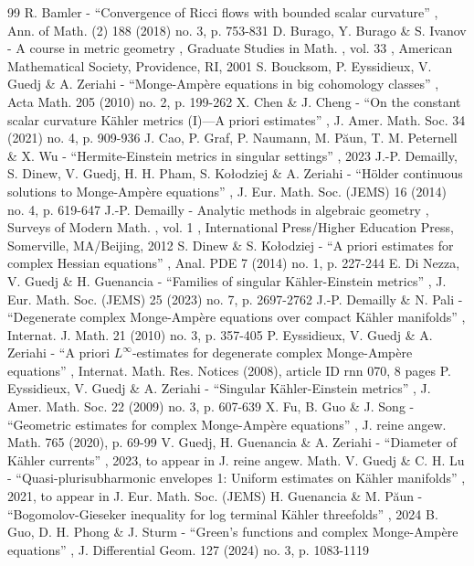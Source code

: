 \documentclass[10pt]{amsart}
\theoremstyle{definition}
\begin{document}
\begin{thebibliography}{99}
 R. Bamler - “Convergence of Ricci flows with bounded scalar curvature” , Ann. of Math. (2) 188 (2018) no. 3, p. 753-831
 D. Burago, Y. Burago \& S. Ivanov - A course in metric geometry , Graduate Studies in Math. , vol. 33 , American Mathematical Society, Providence, RI, 2001
 S. Boucksom, P. Eyssidieux, V. Guedj \& A. Zeriahi - “Monge-Ampère equations in big cohomology classes” , Acta Math. 205 (2010) no. 2, p. 199-262
 X. Chen \& J. Cheng - “On the constant scalar curvature Kähler metrics (I)—A priori estimates” , J. Amer. Math. Soc. 34 (2021) no. 4, p. 909-936
 J. Cao, P. Graf, P. Naumann, M. Păun, T. M. Peternell \& X. Wu - “Hermite-Einstein metrics in singular settings” , 2023
 J.-P. Demailly, S. Dinew, V. Guedj, H. H. Pham, S. Kołodziej \& A. Zeriahi - “Hölder continuous solutions to Monge-Ampère equations” , J. Eur. Math. Soc. (JEMS) 16 (2014) no. 4, p. 619-647
 J.-P. Demailly - Analytic methods in algebraic geometry , Surveys of Modern Math. , vol. 1 , International Press/Higher Education Press, Somerville, MA/Beijing, 2012
 S. Dinew \& S. Kołodziej - “A priori estimates for complex Hessian equations” , Anal. PDE 7 (2014) no. 1, p. 227-244
 E. Di Nezza, V. Guedj \& H. Guenancia - “Families of singular Kähler-Einstein metrics” , J. Eur. Math. Soc. (JEMS) 25 (2023) no. 7, p. 2697-2762
 J.-P. Demailly \& N. Pali - “Degenerate complex Monge-Ampère equations over compact Kähler manifolds” , Internat. J. Math. 21 (2010) no. 3, p. 357-405
 P. Eyssidieux, V. Guedj \& A. Zeriahi - “A priori $L^\infty $-estimates for degenerate complex Monge-Ampère equations” , Internat. Math. Res. Notices (2008), article ID rnn 070, 8 pages
 P. Eyssidieux, V. Guedj \& A. Zeriahi - “Singular Kähler-Einstein metrics” , J. Amer. Math. Soc. 22 (2009) no. 3, p. 607-639
 X. Fu, B. Guo \& J. Song - “Geometric estimates for complex Monge-Ampère equations” , J. reine angew. Math. 765 (2020), p. 69-99
 V. Guedj, H. Guenancia \& A. Zeriahi - “Diameter of Kähler currents” , 2023, to appear in J. reine angew. Math.
 V. Guedj \& C. H. Lu - “Quasi-plurisubharmonic envelopes 1: Uniform estimates on Kähler manifolds” , 2021, to appear in J. Eur. Math. Soc. (JEMS)
 H. Guenancia \& M. Păun - “Bogomolov-Gieseker inequality for log terminal Kähler threefolds” , 2024
 B. Guo, D. H. Phong \& J. Sturm - “Green’s functions and complex Monge-Ampère equations” , J. Differential Geom. 127 (2024) no. 3, p. 1083-1119

\end{thebibliography}
\end{document}
